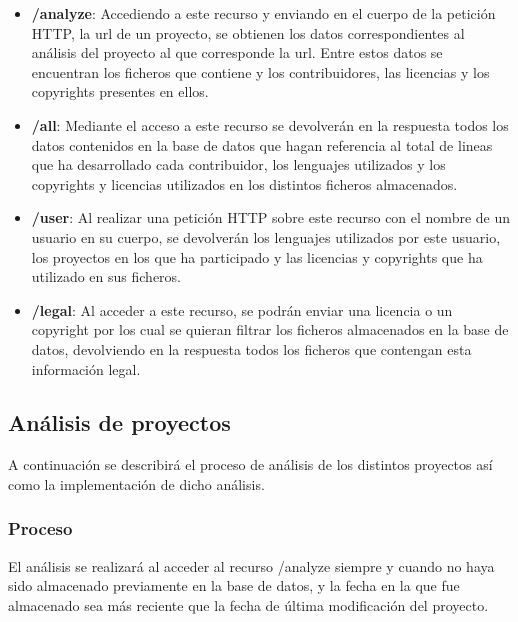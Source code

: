 \documentclass[a4paper, spanish, 12pt]{book}
\begin{document}
\begin{itemize}
  \item \textbf{/analyze}: Accediendo a este recurso y enviando en el cuerpo de
  la petici\'on HTTP, la url de un proyecto, se obtienen los datos correspondientes
  al an\'alisis del proyecto al que corresponde la url. Entre estos datos se
  encuentran los ficheros que contiene y los contribuidores, las licencias y los
  copyrights presentes en ellos.

  \item \textbf{/all}: Mediante el acceso a este recurso se devolver\'an en la
  respuesta todos los datos contenidos en la base de datos que hagan referencia
  al total de lineas que ha desarrollado cada contribuidor, los lenguajes utilizados
  y los copyrights y licencias utilizados en los distintos ficheros almacenados.

  \item \textbf{/user}: Al realizar una petici\'on HTTP sobre este recurso con
  el nombre de un usuario en su cuerpo, se devolver\'an los lenguajes utilizados
  por este usuario, los proyectos en los que ha participado y las licencias y
  copyrights que ha utilizado en sus ficheros.

  \item \textbf{/legal}: Al acceder a este recurso, se podr\'an enviar una licencia
  o un copyright por los cual se quieran filtrar los ficheros almacenados en la
  base de datos, devolviendo en la respuesta todos los ficheros que contengan
  esta informaci\'on legal.

\end{itemize}

\subsection{An\'alisis de proyectos}
\label{subsec:analysis}

A continuaci\'on se describir\'a el proceso de an\'alisis de los distintos proyectos
as\'i como la implementaci\'on de dicho an\'alisis.

\subsubsection*{Proceso}
\label{subsubsec:proceso}

El an\'alisis se realizar\'a al acceder al recurso /analyze
siempre y cuando no haya sido almacenado previamente en la base de datos, y la
fecha en la que fue almacenado sea m\'as reciente que la fecha de \'ultima
modificaci\'on del proyecto.
\end{document}
